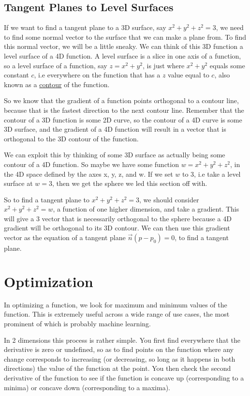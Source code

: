 \documentclass[12pt, letterpaper]{article}
\begin{document}
\subsection{Tangent Planes to Level Surfaces}
If we want to find a tangent plane to a 3D surface, say $x^2 + y^2 + z^2 = 3$, we need to find some normal vector to the surface that we can make a plane from. To find this normal vector, we will be a little sneaky. We can think of this 3D function a level surface of a 4D function. A level surface is a slice in one axis of a function, so a level surface of a function, say $z = x^2 + y^2$, is just where $x^2 + y^2$ equals some constant $c$, i.e everywhere on the function that has a $z$ value equal to $c$, also known as a \hyperref[sssec:Contour Maps]{contour} of the function.

So we know that the gradient of a function points orthogonal to a contour line, because that is the fastest direction to the next contour line. Remember that the contour of a 3D function is some 2D curve, so the contour of a 4D curve is some 3D surface, and the gradient of a 4D function will result in a vector that is orthogonal to the 3D contour of the function. 

We can exploit this by thinking of some 3D surface as actually being some contour of a 4D function. So maybe we have some function $w = x^2 + y^2 + z^2$, in the 4D space defined by the axes x, y, z, and w. If we set $w$ to $3$, i.e take a level surface at $w=3$, then we get the sphere we led this section off with.

So to find a tangent plane to $x^2 + y^2 + z^2 = 3$, we should consider $x^2 + y^2 + z^2 = w$, a function of one higher dimension, and take a gradient. This will give a 3 vector that is necessarily orthogonal to the sphere because a 4D gradient will be orthogonal to its 3D contour. We can then use this gradient vector as the equation of a tangent plane $\vec{n}(p - p_0) = 0$, to find a tangent plane.

\section{Optimization}

In optimizing a function, we look for maximum and minimum values of the function. This is extremely useful across a wide range of use cases, the most prominent of which is probably machine learning.

In 2 dimensions this process is rather simple. You first find everywhere that the derivative is zero or undefined, so as to find points on the function where any change corresponds to increasing (or decreasing, so long as it happens in both directions) the value of the function at the point. You then check the second derivative of the function to see if the function is concave up (corresponding to a minima) or concave down (corresponding to a maxima).
\end{document}
